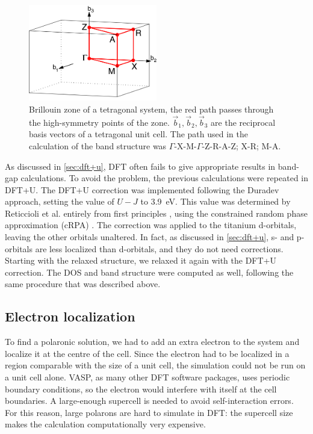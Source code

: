 \begin{figure}
    \centering
    \includegraphics[width=0.5\textwidth]{figures/brillouin_zone}
    \caption[Brillouin zone of a tetragonal system]{Brillouin zone of a tetragonal system, the red path passes through the high-symmetry points of the zone. $\vec{b}_1, \vec{b}_2, \vec{b}_3$ are the reciprocal basis vectors of a tetragonal unit cell. The path used in the calculation of the band structure was $\Gamma$-X-M-$\Gamma$-Z-R-A-Z; X-R; M-A.}
    \label{fig:symmetry_points}
\end{figure}

As discussed in \cref{sec:dft+u}, DFT often fails to give appropriate results in band-gap calculations. To avoid the problem, the previous calculations were repeated in DFT+U.  The DFT+U correction was implemented following the Duradev approach, setting the value of $U-J$ to \SI{3.9}{eV}. This value was determined by Reticcioli et al. entirely from first principles \cite{reticcioli2022}, using the constrained random phase approximation (cRPA) \cite{aryasetiawan2006}. The correction was applied to the titanium d-orbitals, leaving the other orbitals unaltered. In fact, as discussed in \cref{sec:dft+u}, s- and p-orbitals are less localized than d-orbitals, and they do not need corrections. Starting with the relaxed structure, we relaxed it again with the DFT+U correction. The DOS and band structure were computed as well, following the same procedure that was described above.

\subsection{Electron localization}
To find a polaronic solution, we had to add an extra electron to the system and localize it at the centre of the cell. Since the electron had to be localized in a region comparable with the size of a unit cell, the simulation could not be run on a unit cell alone. VASP, as many other DFT software packages, uses periodic boundary conditions, so the electron would interfere with itself at the cell boundaries. A large-enough supercell is needed to avoid self-interaction errors. For this reason, large polarons are hard to simulate in DFT: the supercell size  makes the calculation computationally very expensive.

